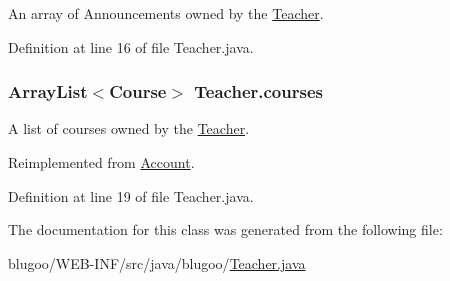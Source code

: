 An array of Announcements owned by the \hyperlink{classTeacher}{Teacher}. 



Definition at line 16 of file Teacher.java.\hypertarget{classTeacher_ee7404da23833c44e12c5c460f480931}{
\subsubsection{\setlength{\rightskip}{0pt plus 5cm}ArrayList$<${\bf Course}$>$ {\bf Teacher.courses}}}
\label{classTeacher_ee7404da23833c44e12c5c460f480931}


A list of courses owned by the \hyperlink{classTeacher}{Teacher}. 



Reimplemented from \hyperlink{classAccount_465319ae346d4b7e3233f7c3325443dd}{Account}.

Definition at line 19 of file Teacher.java.

The documentation for this class was generated from the following file:\begin{CompactItemize}
\item 
blugoo/WEB-INF/src/java/blugoo/\hyperlink{Teacher_8java}{Teacher.java}\end{CompactItemize}
